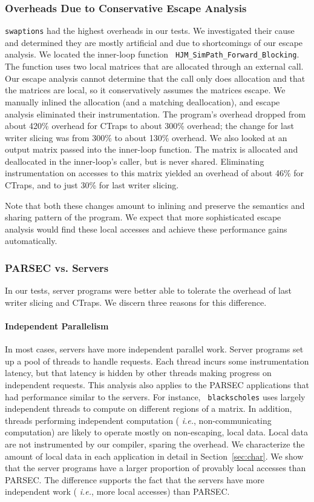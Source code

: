 \documentclass[preprint,9pt]{sigplanconf}
\newcommand{\ctraps}{CTraps\xspace}
\begin{document}
\subsubsection{Overheads Due to Conservative Escape Analysis}
\label{sec:eval:conservative}
{\tt swaptions} had the highest overheads in our tests.  We investigated their
cause and determined they are mostly artificial and due to shortcomings of our
escape analysis.  We located the inner-loop function {\tt
HJM\_SimPath\_Forward\_Blocking}.  The function uses two local matrices that
are allocated through an external call.  Our escape analysis cannot determine
that the call only does allocation and that the matrices are local, so it
conservatively assumes the matrices escape.  We manually inlined the allocation
(and a matching deallocation), and escape analysis eliminated their
instrumentation.  The program's overhead dropped from about 420\% overhead for
\ctraps to about 300\% overhead; the change for last writer slicing was from 300\% to about
130\% overhead.  We also looked at an output matrix passed into the inner-loop
function.  The matrix is allocated and deallocated in the inner-loop's caller,
but is never shared.  Eliminating instrumentation on accesses to this matrix
yielded an overhead of about 46\% for \ctraps, and to just 30\% for
last writer slicing.

Note that both these changes amount to inlining and preserve the semantics and
sharing pattern of the program.  We expect that more sophisticated escape
analysis would find these local accesses and achieve these performance gains
automatically.


\subsubsection{PARSEC vs. Servers}
\label{sec:eval:parsecserver}
In our tests, server programs were better able to tolerate the overhead of
last writer slicing and \ctraps.   We discern three reasons for this difference.

\paragraph{Independent Parallelism}
In most cases, servers have more independent parallel work.  Server programs
set up a pool of threads to handle requests.  Each thread incurs some
instrumentation latency, but that latency is hidden by other threads making
progress on independent requests.  This analysis also applies to the PARSEC
applications that had performance similar to the servers.  For instance, {\tt
blackscholes} uses largely independent threads to compute on different regions
of a matrix.  In addition, threads performing independent computation ({\em
i.e.}, non-communicating computation) are likely to operate mostly on
non-escaping, local data.  Local data are not instrumented by our compiler,
sparing the overhead.  We characterize the amount of local data in each
application in detail in Section~\ref{sec:char}.  We show that the server
programs have a larger proportion of provably local accesses than PARSEC.  The
difference supports the fact that the servers have more independent work ({\em
i.e.}, more local accesses) than PARSEC. 
\end{document}
